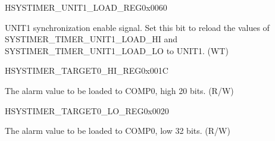 \begin{register}{H}{SYSTIMER\_UNIT1\_LOAD\_REG}{0x{}0060}\label{regdesc:SYSTIMERUNIT1LOADREG}
%
%
\regnewline%
\begin{regdesc}\begin{reglist}
\label{fielddesc:SYSTIMERTIMERUNIT1LOAD}\item [SYSTIMER\_TIMER\_UNIT1\_LOAD] UNIT1 synchronization enable signal. Set this bit to reload the values of SYSTIMER\_TIMER\_UNIT1\_LOAD\_HI and SYSTIMER\_TIMER\_UNIT1\_LOAD\_LO to UNIT1. (WT)
\end{reglist}\end{regdesc}
\end{register}


\begin{register}{H}{SYSTIMER\_TARGET0\_HI\_REG}{0x{}001C}\label{regdesc:SYSTIMERTARGET0HIREG}
%
%
\regnewline%
\begin{regdesc}\begin{reglist}
\label{fielddesc:SYSTIMERTIMERTARGET0HI}\item [SYSTIMER\_TIMER\_TARGET0\_HI] The alarm value to be loaded to COMP0, high 20 bits. (R/W)
\end{reglist}\end{regdesc}
\end{register}


\begin{register}{H}{SYSTIMER\_TARGET0\_LO\_REG}{0x{}0020}\label{regdesc:SYSTIMERTARGET0LOREG}
%
\regnewline%
\begin{regdesc}\begin{reglist}
\label{fielddesc:SYSTIMERTIMERTARGET0LO}\item [SYSTIMER\_TIMER\_TARGET0\_LO] The alarm value to be loaded to COMP0, low 32 bits. (R/W)
\end{reglist}\end{regdesc}
\end{register}


